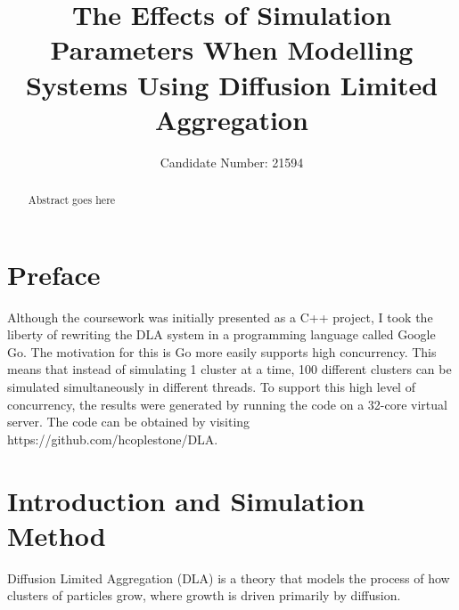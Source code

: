 \documentclass[11pt]{iopart}
\begin{document}
\setlength{\marginparwidth}{1.5cm}

\title[]{The Effects of Simulation Parameters When Modelling Systems Using Diffusion Limited Aggregation}

\author{Candidate Number: 21594}

\address{Department of Physics,
University of Bath, Bath BA2 7AY, United Kingdom}
\begin{abstract}
Abstract goes here
\end{abstract}

\listoftodos



\section*{Preface}
Although the coursework was initially presented as a C++ project, I took the liberty of rewriting the DLA system in a programming language called Google Go. The motivation for this is Go more easily supports high concurrency. This means that instead of simulating 1 cluster at a time, 100 different clusters can be simulated simultaneously in different threads. To support this high level of concurrency, the results were generated by running the code on a 32-core virtual server. The code can be obtained by visiting https://github.com/hcoplestone/DLA.

\section{Introduction and Simulation Method}

Diffusion Limited Aggregation (DLA) is a theory that models the process of how clusters of particles grow, where growth is driven primarily by diffusion. \cite{dla}
\end{document}

